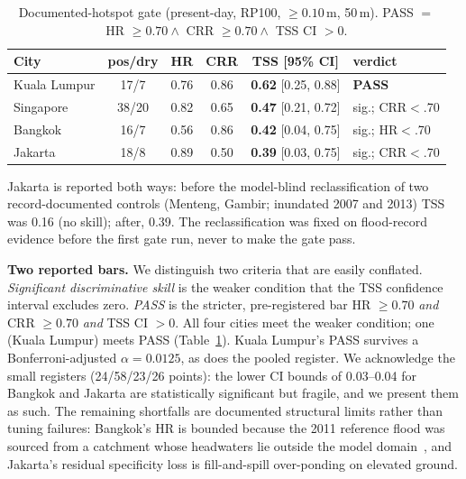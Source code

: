 \documentclass[11pt,a4paper]{article}
\begin{document}
\begin{table}[t]
\centering
\caption{Documented-hotspot gate (present-day, RP100, $\geq 0.10$\,m, 50\,m). PASS $=$ HR $\geq 0.70 \wedge$ CRR $\geq 0.70 \wedge$ TSS CI $>0$.}
\label{tab:gate}
\small
\begin{tabular}{@{}lccccl@{}}
\toprule
City         & pos/dry & HR   & CRR  & TSS [95\% CI]              & verdict \\
\midrule
Kuala Lumpur & 17/7    & 0.76 & 0.86 & \textbf{0.62} [0.25, 0.88] & \textbf{PASS} \\
Singapore    & 38/20   & 0.82 & 0.65 & \textbf{0.47} [0.21, 0.72] & sig.; CRR$<$.70 \\
Bangkok      & 16/7    & 0.56 & 0.86 & \textbf{0.42} [0.04, 0.75] & sig.; HR$<$.70 \\
Jakarta      & 18/8    & 0.89 & 0.50 & \textbf{0.39} [0.03, 0.75] & sig.; CRR$<$.70 \\
\bottomrule
\end{tabular}

\vspace{3pt}
{\footnotesize Jakarta is reported both ways: before the model-blind reclassification of two record-documented controls (Menteng, Gambir; inundated 2007 and 2013) TSS was 0.16 (no skill); after, 0.39. The reclassification was fixed on flood-record evidence before the first gate run, never to make the gate pass.}
\end{table}

\textbf{Two reported bars.} We distinguish two criteria that are easily conflated. \emph{Significant discriminative skill} is the weaker condition that the TSS confidence interval excludes zero. \emph{PASS} is the stricter, pre-registered bar HR $\geq 0.70$ \emph{and} CRR $\geq 0.70$ \emph{and} TSS CI $>0$. All four cities meet the weaker condition; one (Kuala Lumpur) meets PASS (Table~\ref{tab:gate}). Kuala Lumpur's PASS survives a Bonferroni-adjusted $\alpha = 0.0125$, as does the pooled register. We acknowledge the small registers (24/58/23/26 points): the lower CI bounds of 0.03--0.04 for Bangkok and Jakarta are statistically significant but fragile, and we present them as such. The remaining shortfalls are documented structural limits rather than tuning failures: Bangkok's HR is bounded because the 2011 reference flood was sourced from a catchment whose headwaters lie outside the model domain~\cite{komori2012}, and Jakarta's residual specificity loss is fill-and-spill over-ponding on elevated ground.
\end{document}

